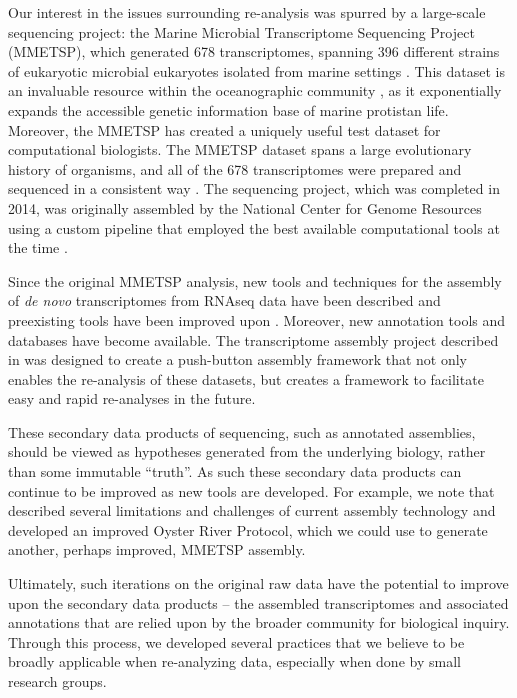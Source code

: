 \documentclass[a4paper,num-refs]{oup-contemporary}
\begin{document}

Our interest in the issues surrounding re-analysis was spurred by a large-scale sequencing project: the Marine Microbial Transcriptome Sequencing Project (MMETSP), which generated 678 transcriptomes, spanning 396 different strains of eukaryotic microbial eukaryotes isolated from marine settings \cite{Caron2016}. This dataset is an invaluable resource within the oceanographic community \cite{Keeling2014, Caron2016}, as it exponentially expands the accessible genetic information base of marine protistan life. Moreover, the MMETSP has created a uniquely useful test dataset for computational biologists. The MMETSP dataset spans a large evolutionary history of organisms, and all of the 678 transcriptomes were prepared and sequenced in a consistent way \cite{Keeling2014}. The sequencing project, which was completed in 2014, was originally assembled by the National Center for Genome Resources using a custom pipeline that employed the best available computational tools at the time \cite{Simpson2009, Huang1999}.

Since the original MMETSP analysis, new tools and techniques for the assembly of {\em de novo} transcriptomes from RNAseq data have been described and preexisting tools have been improved upon \cite{Grabherr2011}. Moreover, new annotation tools and databases have become available. The transcriptome assembly project described in \citet{Johnson2018} was designed to create a push-button assembly framework that not only enables the re-analysis of these datasets, but creates a framework to facilitate easy and rapid re-analyses in the future.

These secondary data products of sequencing, such as annotated
assemblies, should be viewed as hypotheses generated from the
underlying biology, rather than some immutable ``truth''. As such these
secondary data products can continue to be improved as new tools are
developed.  For example, we note that \citet{MacManes177253} described several
limitations and challenges of current assembly technology and developed
an improved Oyster River Protocol, which we could use to generate another,
perhaps improved, MMETSP assembly.

Ultimately, such iterations on the original raw data have the
potential to improve upon the secondary data products -- the assembled
transcriptomes and associated annotations that are relied upon by the
broader community for biological inquiry. Through this process, we developed several
practices that we believe to be broadly applicable when re-analyzing data,
especially when done by small research groups.
\end{document}
